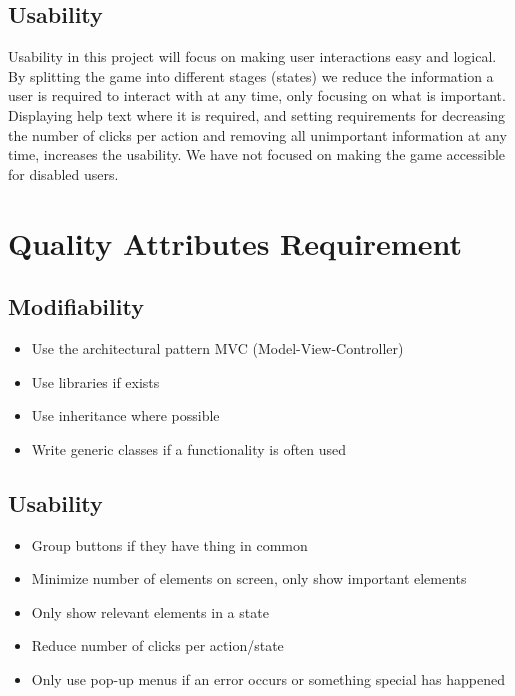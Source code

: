 			\subsection{Usability}
			Usability in this project will focus on making user interactions easy and logical. By splitting the game into different stages (states) we reduce the information a user is required to interact with at any time, only focusing on what is important. Displaying help text where it is required, and setting requirements for decreasing the number of clicks per action and removing all unimportant information at any time, increases the usability. We have not focused on making the game accessible for disabled users.

	\section{Quality Attributes Requirement}
		\subsection{Modifiability}
		\begin{itemize}
			\item Use the architectural pattern MVC (Model-View-Controller)
			\item Use libraries if exists
			\item Use inheritance where possible
			\item Write generic classes if a functionality is often used
			\end{itemize}
			
		\subsection{Usability}
		\begin{itemize}
			\item Group buttons if they have thing in common
			\item Minimize number of elements on screen, only show important elements
			\item Only show relevant elements in a state
			\item Reduce number of clicks per action/state
			\item Only use pop-up menus if an error occurs or something special has happened
		\end{itemize}

